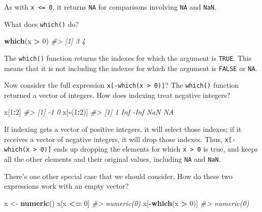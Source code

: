 \documentclass[]{book}
\newenvironment{Shaded}{\begin{snugshade}}{\end{snugshade}}
\newcommand{\CommentTok}[1]{\textcolor[rgb]{0.56,0.35,0.01}{\textit{#1}}}
\newcommand{\DecValTok}[1]{\textcolor[rgb]{0.00,0.00,0.81}{#1}}
\newcommand{\KeywordTok}[1]{\textcolor[rgb]{0.13,0.29,0.53}{\textbf{#1}}}
\newcommand{\NormalTok}[1]{#1}
\newcommand{\OperatorTok}[1]{\textcolor[rgb]{0.81,0.36,0.00}{\textbf{#1}}}
\newcommand{\StringTok}[1]{\textcolor[rgb]{0.31,0.60,0.02}{#1}}
\theoremstyle{plain}
\theoremstyle{remark}
\begin{document}
As with \texttt{x\ \textless{}=\ 0}, it returns \texttt{NA} for comparisons involving \texttt{NA} and \texttt{NaN}.

What does \texttt{which()} do?

\begin{Shaded}
\begin{Highlighting}[]
\KeywordTok{which}\NormalTok{(x }\OperatorTok{>}\StringTok{ }\DecValTok{0}\NormalTok{)}
\CommentTok{#> [1] 3 4}
\end{Highlighting}
\end{Shaded}

The \texttt{which()} function returns the indexes for which the argument is \texttt{TRUE}.
This means that it is not including the indexes for which the argument is \texttt{FALSE} or \texttt{NA}.

Now consider the full expression \texttt{x{[}-which(x\ \textgreater{}\ 0){]}}?
The \texttt{which()} function returned a vector of integers.
How does indexing treat negative integers?

\begin{Shaded}
\begin{Highlighting}[]
\NormalTok{x[}\DecValTok{1}\OperatorTok{:}\DecValTok{2}\NormalTok{]}
\CommentTok{#> [1] -1  0}
\NormalTok{x[}\OperatorTok{-}\NormalTok{(}\DecValTok{1}\OperatorTok{:}\DecValTok{2}\NormalTok{)]}
\CommentTok{#> [1]    1  Inf -Inf  NaN   NA}
\end{Highlighting}
\end{Shaded}

If indexing gets a vector of positive integers, it will select those indexes;
if it receives a vector of negative integers, it will drop those indexes.
Thus, \texttt{x{[}-which(x\ \textgreater{}\ 0){]}} ends up dropping the elements for which \texttt{x\ \textgreater{}\ 0} is true,
and keeps all the other elements and their original values, including \texttt{NA} and \texttt{NaN}.

There's one other special case that we should consider. How do these two expressions work with
an empty vector?

\begin{Shaded}
\begin{Highlighting}[]
\NormalTok{x <-}\StringTok{ }\KeywordTok{numeric}\NormalTok{()}
\NormalTok{x[x }\OperatorTok{<=}\StringTok{ }\DecValTok{0}\NormalTok{]}
\CommentTok{#> numeric(0)}
\NormalTok{x[}\OperatorTok{-}\KeywordTok{which}\NormalTok{(x }\OperatorTok{>}\StringTok{ }\DecValTok{0}\NormalTok{)]}
\CommentTok{#> numeric(0)}
\end{Highlighting}
\end{Shaded}
\end{document}
